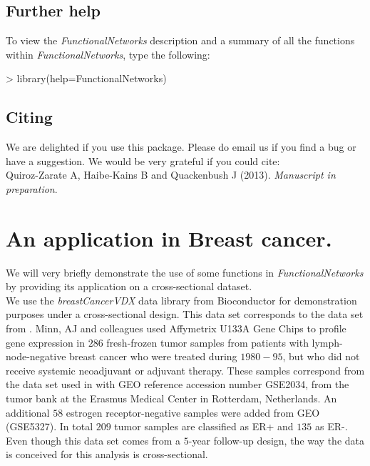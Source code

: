 \documentclass[12pt]{article}
\newcommand{\Rpackage}[1]{\textit{#1}}
\begin{document}
\subsection{Further help}
To view the \Rpackage{FunctionalNetworks} description and a summary of all the functions within \Rpackage{FunctionalNetworks}, type the following:
\begin{Schunk}
\begin{Sinput}
> library(help=FunctionalNetworks)
\end{Sinput}
\end{Schunk}
\subsection{Citing}
We are delighted if you use this package. Please do email us if you find a bug or have a suggestion.  We would be very grateful if you could cite:\\
Quiroz-Zarate A, Haibe-Kains B and Quackenbush J (2013). \textit{Manuscript in preparation}.
\section{An application in Breast cancer.}
We will very briefly demonstrate the use of some functions in \Rpackage{FunctionalNetworks} by providing its application on a cross-sectional dataset.\\
We use the \Rpackage{breastCancerVDX} data library from Bioconductor for demonstration purposes under a cross-sectional design. This data set corresponds to the data set from \cite{Minn2007}. Minn, AJ  and colleagues used Affymetrix U133A Gene Chips to profile gene expression in $286$ fresh-frozen tumor samples from patients with lymph-node-negative breast cancer who were treated during $1980-95$, but who did not receive systemic neoadjuvant or adjuvant therapy. These samples correspond from the data set used in \cite{Wang2005} with GEO reference accession number GSE2034, from the tumor bank at the Erasmus Medical Center in Rotterdam, Netherlands. An additional $58$ estrogen receptor-negative samples were added from \cite{Minn2007} GEO (GSE5327). In total $209$ tumor samples are classified as ER+ and $135$ as ER-. Even though this data set comes from a $5$-year follow-up design, the way the data is conceived for this analysis is cross-sectional.\\
\end{document}
